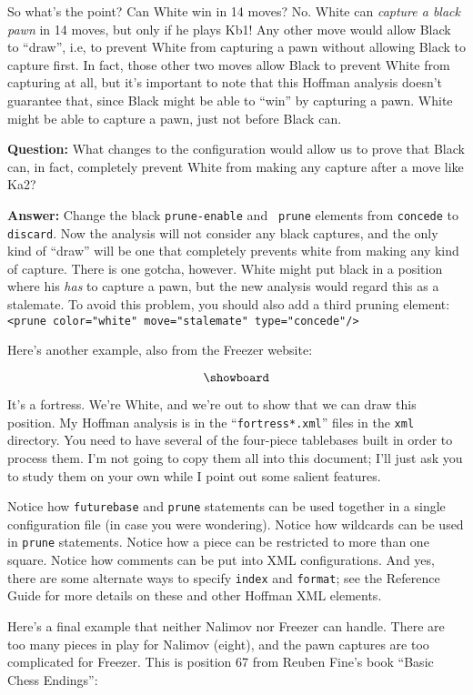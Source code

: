 \documentclass[11pt]{article}
\begin{document}
So what's the point?  Can White win in 14 moves?  No.  White can {\it
capture a black pawn} in 14 moves, but only if he plays Kb1!  Any
other move would allow Black to ``draw'', i.e, to prevent White from
capturing a pawn without allowing Black to capture first.  In fact,
those other two moves allow Black to prevent White from capturing at
all, but it's important to note that this Hoffman analysis doesn't
guarantee that, since Black might be able to ``win'' by capturing a
pawn.  White might be able to capture a pawn, just not before Black
can.

{\bf Question:} What changes to the configuration would allow us to
prove that Black can, in fact, completely prevent White from making
any capture after a move like Ka2?

{\bf Answer:} Change the black {\tt prune-enable} and {\tt
prune} elements from {\tt concede} to {\tt discard}.  Now the analysis
will not consider any black captures, and the only kind of ``draw''
will be one that completely prevents white from making any kind of
capture.  There is one gotcha, however.  White might put black in a
position where his {\it has} to capture a pawn, but the new analysis
would regard this as a stalemate.  To avoid this problem, you should
also add a third pruning element: {\tt <prune color="white"
move="stalemate" type="concede"/>}

Here's another example, also from the Freezer website:

$$\showboard$$

It's a fortress.  We're White, and we're out to show that we can draw
this position.  My Hoffman analysis is in the ``{\tt fortress*.xml}''
files in the {\tt xml} directory.  You need to have several of
the four-piece tablebases built in order to process them.  I'm not
going to copy them all into this document; I'll just ask you to study
them on your own while I point out some salient features.

Notice how {\tt futurebase} and {\tt prune} statements can be used
together in a single configuration file (in case you were wondering).
Notice how wildcards can be used in {\tt prune} statements.  Notice
how a piece can be restricted to more than one square.  Notice how
comments can be put into XML configurations.  And yes, there are some
alternate ways to specify {\tt index} and {\tt format}; see
the Reference Guide for more details on these and other
Hoffman XML elements.

Here's a final example that neither Nalimov nor Freezer can handle.
There are too many pieces in play for Nalimov (eight), and the pawn
captures are too complicated for Freezer.  This is position 67 from
Reuben Fine's book ``Basic Chess Endings'':
\end{document}
